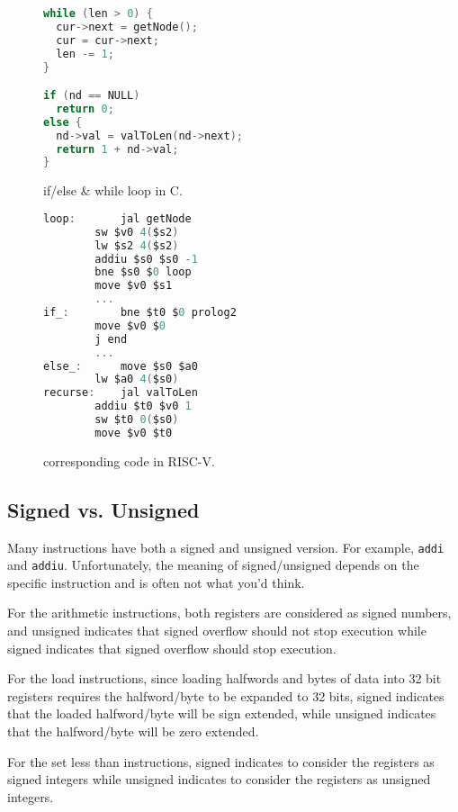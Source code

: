 \documentclass{article}
\begin{document}
\begin{figure}
\centering
\begin{minipage}{0.4\textwidth}
\renewcommand{\ttdefault}{pcr}
\begin{lstlisting}[language=C, basicstyle=\ttfamily]
while (len > 0) {
  cur->next = getNode();
  cur = cur->next;
  len -= 1;
}

if (nd == NULL)
  return 0;
else {
  nd->val = valToLen(nd->next);
  return 1 + nd->val;
}
\end{lstlisting}
\caption{if/else \& while loop in C.}
\vfill
\end{minipage}\hfill
%
\begin{minipage}{0.4\textwidth}
\raggedright
\renewcommand{\ttdefault}{pcr}
\begin{lstlisting}[language=C, basicstyle=\ttfamily, keywordstyle=\bfseries, showstringspaces=false, morekeywords={jal, addu, move, bne, j, sw, addiu, lw, jr}]
loop:		jal getNode
		sw $v0 4($s2)
		lw $s2 4($s2)
		addiu $s0 $s0 -1
		bne $s0 $0 loop
		move $v0 $s1
		...
if_:		bne $t0 $0 prolog2
		move $v0 $0
		j end
		...
else_:		move $s0 $a0
		lw $a0 4($s0)
recurse:	jal valToLen
		addiu $t0 $v0 1
		sw $t0 0($s0)
		move $v0 $t0		
\end{lstlisting}
\caption{corresponding code in RISC-V.}
\end{minipage}
%

\end{figure}

\subsection{Signed vs. Unsigned}
Many instructions have both a signed and unsigned version. For example, \texttt{addi} and \texttt{addiu}. Unfortunately, the meaning of signed/unsigned depends on the specific instruction and is often not what you'd think. 

For the arithmetic instructions, both registers are considered as signed numbers, and unsigned indicates that signed overflow should not stop execution while signed indicates that signed overflow should stop execution. 

For the load instructions, since loading halfwords and bytes of data into 32 bit registers requires the halfword/byte to be expanded to 32 bits, signed indicates that the loaded halfword/byte will be sign extended, while unsigned indicates that the halfword/byte will be zero extended. 

For the set less than instructions, signed indicates to consider the registers as signed integers while unsigned indicates to consider the registers as unsigned integers.
\end{document}
